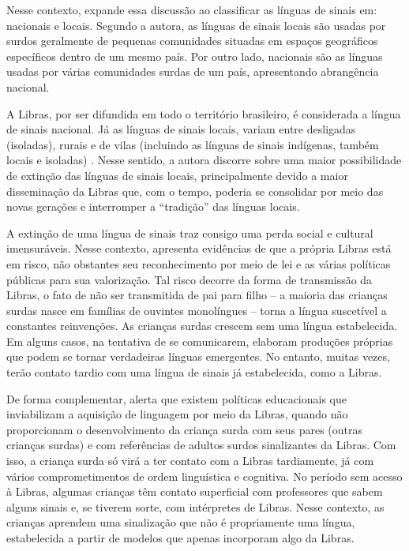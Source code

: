 Nesse contexto,  expande essa discussão ao classificar as línguas de sinais em: nacionais e locais. Segundo a autora, as línguas de sinais locais são usadas por surdos geralmente de pequenas comunidades situadas em espaços geográficos específicos dentro de um mesmo país. Por outro lado, nacionais são as línguas usadas por várias comunidades surdas de um país, apresentando abrangência nacional. 

A Libras, por ser difundida em todo o território brasileiro, é considerada a língua de sinais nacional. Já as línguas de sinais locais, variam entre desligadas (isoladas), rurais e de vilas (incluindo as línguas de sinais indígenas, também locais e isoladas) \cite{Quadros2017,Quadros2019}. Nesse sentido, a autora discorre sobre uma maior possibilidade de extinção das línguas de sinais locais, principalmente devido a maior disseminação da Libras que, com o tempo, poderia se consolidar por meio das novas gerações e interromper a ``tradição'' das línguas locais.

A extinção de uma língua de sinais traz consigo uma perda social e cultural imensuráveis. Nesse contexto,  apresenta evidências de que a própria Libras está em risco, não obstantes seu reconhecimento por meio de lei e as várias políticas públicas para sua valorização. Tal risco decorre da forma de transmissão da Libras, o fato de não ser transmitida de pai para filho -- a maioria das crianças surdas nasce em famílias de ouvintes monolíngues -- torna a língua suscetível a constantes reinvenções. As crianças surdas crescem sem uma língua estabelecida. Em alguns casos, na tentativa de se comunicarem, elaboram produções próprias que podem se tornar verdadeiras línguas emergentes. No entanto, muitas vezes, terão contato tardio com uma língua de sinais já estabelecida, como a Libras.

De forma complementar,  alerta que existem políticas educacionais que inviabilizam a aquisição de linguagem por meio da Libras, quando não proporcionam o desenvolvimento da criança surda com seus pares (outras crianças surdas) e com referências de adultos surdos sinalizantes da Libras. Com isso, a criança surda só virá a ter contato com a Libras tardiamente, já com vários comprometimentos de ordem linguística e cognitiva. No período sem acesso à Libras, algumas crianças têm contato superficial com professores que sabem alguns sinais e, se tiverem sorte, com intérpretes de Libras. Nesse contexto, as crianças aprendem uma sinalização que não é propriamente uma língua, estabelecida a partir de modelos que apenas incorporam algo da Libras.

